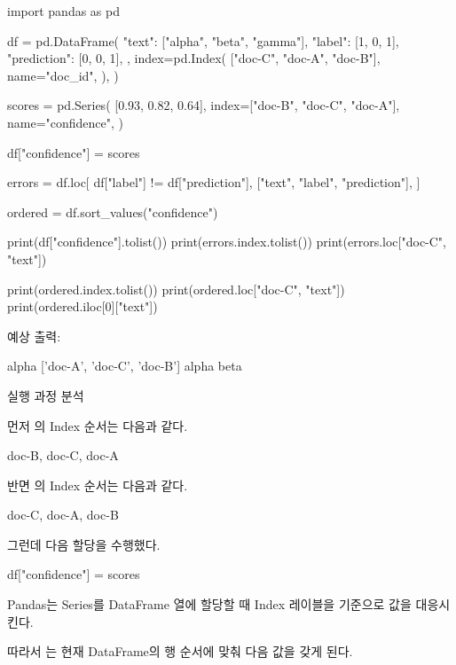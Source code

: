 \begin{dhkcode}
import pandas as pd

df = pd.DataFrame(
    {
        "text": ["alpha", "beta", "gamma"],
        "label": [1, 0, 1],
        "prediction": [0, 0, 1],
    },
    index=pd.Index(
        ["doc-C", "doc-A", "doc-B"],
        name="doc_id",
    ),
)

scores = pd.Series(
    [0.93, 0.82, 0.64],
    index=["doc-B", "doc-C", "doc-A"],
    name="confidence",
)

df["confidence"] = scores

errors = df.loc[
    df["label"] != df["prediction"],
    ["text", "label", "prediction"],
]

ordered = df.sort_values("confidence")

print(df["confidence"].tolist())
print(errors.index.tolist())
print(errors.loc["doc-C", "text"])

print(ordered.index.tolist())
print(ordered.loc["doc-C", "text"])
print(ordered.iloc[0]["text"])
\end{dhkcode}

예상 출력:

\begin{dhkzsh}
[0.82, 0.64, 0.93]
['doc-C']
alpha
['doc-A', 'doc-C', 'doc-B']
alpha
beta
\end{dhkzsh}

\begin{dhknote}
\begin{dhksmry}[centered]
실행 과정 분석
\end{dhksmry}
\end{dhknote}

먼저 의 Index 순서는 다음과 같다.

\begin{dhkzsh}
doc-B, doc-C, doc-A
\end{dhkzsh}

반면 의 Index 순서는 다음과 같다.

\begin{dhkzsh}
doc-C, doc-A, doc-B
\end{dhkzsh}

그런데 다음 할당을 수행했다.

\begin{dhkcode}
df["confidence"] = scores
\end{dhkcode}

Pandas는 Series를 DataFrame 열에 할당할 때 Index 레이블을 기준으로 값을 대응시킨다.

따라서 는 현재 DataFrame의 행 순서에 맞춰 다음 값을 갖게 된다.

